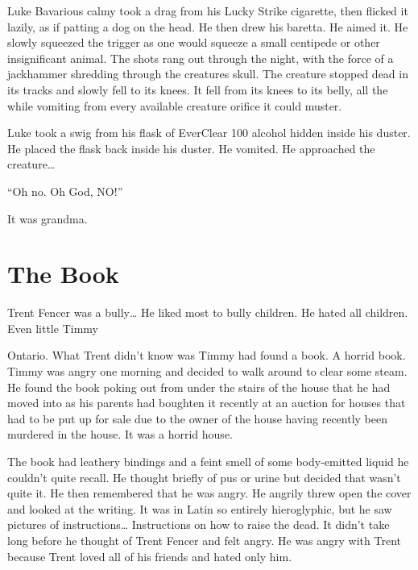 Luke Bavarious calmy took a drag from his Lucky Strike cigarette,
then flicked it lazily, as if patting a dog on the head. He then
drew his baretta. He aimed it. He slowly squeezed the trigger as
one would squeeze a small centipede or other insignificant animal.
The shots rang out through the night, with the force of a
jackhammer shredding through the creatures skull. The creature
stopped dead in its tracks and slowly fell to its knees. It fell
from its knees to its belly, all the while vomiting from every
available creature orifice it could muster.



Luke took a swig from his flask of EverClear 100%
alcohol hidden inside his duster. He placed the flask back inside
his duster. He vomited. He approached the creature{\ldots}



``Oh no. Oh God, NO!''



It was grandma. 
 





\chapter{The Book}



Trent Fencer was a bully{\ldots} He liked most to bully children. He
hated all children. Even little Timmy

Ontario. What Trent didn't know was Timmy had found a book. A
horrid book. Timmy was angry one morning and decided to walk around
to clear some steam. He found the book poking out from under the
stairs of the house that he had moved into as his parents had
boughten it recently at an auction for houses that had to be put up
for sale due to the owner of the house having recently been
murdered in the house. It was a horrid house.



The book had leathery bindings and a feint smell of some
body-emitted liquid he couldn't quite recall. He thought briefly of
pus or urine but decided that wasn't quite it. He then remembered
that he was angry. He angrily threw open the cover and looked at
the writing. It was in Latin so entirely hieroglyphic, but he saw
pictures of instructions{\ldots} Instructions on how to raise the dead.
It didn't take long before he thought of Trent Fencer and felt
angry. He was angry with Trent because Trent loved all of his
friends and hated only him.



